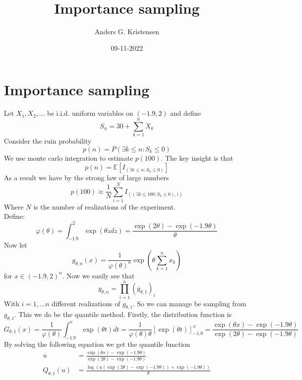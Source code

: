 \documentclass[a4paper, 11 pt]{article}
\title{Importance sampling}
\author{Anders G. Kristensen}
\date{09-11-2022}
\begin{document}
\maketitle
\section{Importance sampling}
\noindent Let $X_1,X_2,\dots$ be i.i.d. uniform variables on $(-1.9, 2)$ and define
\[
    S_n = 30 + \sum_{k = 1}^n X_k
\]
Consider the ruin probability
\[
    p(n) = P(\exists k\leq n : S_k \leq 0)
\]
We use monte carlo integration to estimate $p(100)$. The key insight is that
\[
    p(n) = \mathbb{E}\left[I_{\left(\exists k\leq n : S_k\leq 0\right)}\right]    
\]
As a result we have by the strong law of large numbers
\[
    p(100) \approx \frac{1}{N}\sum_{i = 1}^N I_{\left(\left(\exists k\leq 100 : S_k\leq 0\right),i\right)}
\]
Where $N$ is the number of realizations of the experiment.\\
Define:
\[
\varphi(\theta) = \int_{-1.9}^2 \exp\left(\theta z dz\right) = \frac{\exp\left(2\theta\right)-\exp\left(-1.9\theta\right)}{\theta}    
\]
Now let 
\[
    g_{\theta, n}(x) = \frac{1}{\varphi(\theta)^n}\exp{\left(\theta \sum_{k = 1}^n x_k\right)}  
\]
for $x\in(-1.9,2)^n$. Now we easily see that 
\[
    g_{\theta, n} = \prod_{i = 1}^n\left(g_{\theta, 1}\right)_i
\]
With $i = 1,\dots n$ different realizations of $g_{\theta,1}$. So we can manage be sampling from $g_{\theta,1}$. This we do be the quantile method. Firstly, the distribution function is
\[
    G_{\theta,1}(x) = \frac{1}{\varphi(\theta)}\int_{-1.9}^x \exp\left(\theta t\right)dt = \frac{1}{\varphi(\theta)\theta}\left[\exp(\theta t)\right]_{-1.9}^x = \frac{\exp(\theta x)-\exp(-1.9\theta)}{\exp(2\theta)-\exp(-1.9\theta)}
\]
By solving the following equation we get the quantile function
\begin{align*}
    u &= \frac{\exp\left(\theta x\right)-\exp(-1.9\theta)}{\exp(2\theta)-\exp(-1.9\theta)} \\
    Q_{\theta,1}(u) &= \frac{\log\left(u\left(\exp(2\theta)-\exp(-1.9\theta)\right)+\exp(-1.9\theta)\right)}{\theta}
\end{align*}
\end{document}
